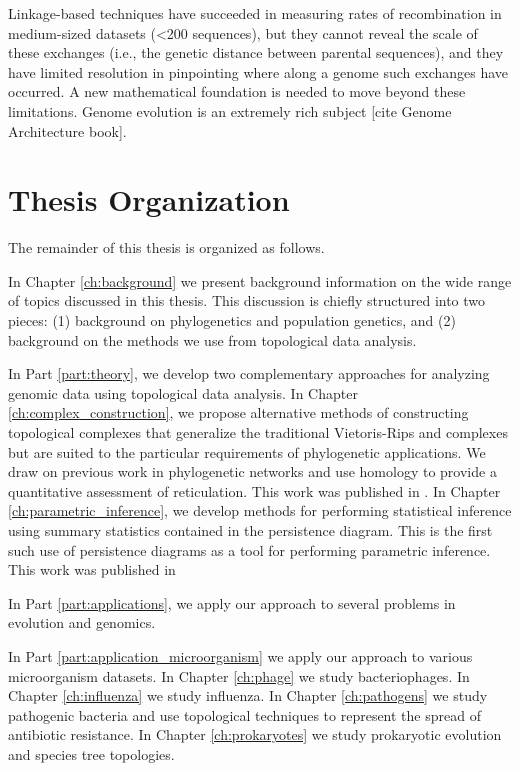 Linkage-based techniques have succeeded in measuring rates of recombination in medium-sized datasets (<200 sequences), but they cannot reveal the scale of these exchanges (i.e., the genetic distance between parental sequences), and they have limited resolution in pinpointing where along a genome such exchanges have occurred.
A new mathematical foundation is needed to move beyond these limitations.
Genome evolution is an extremely rich subject [cite Genome Architecture book].

\section{Thesis Organization}

The remainder of this thesis is organized as follows.

In Chapter \ref{ch:background} we present background information on the wide range of topics discussed in this thesis.
This discussion is chiefly structured into two pieces: (1) background on phylogenetics and population genetics, and (2) background on the methods we use from topological data analysis.

In Part \ref{part:theory}, we develop two complementary approaches for analyzing genomic data using topological data analysis.
In Chapter \ref{ch:complex_construction}, we propose alternative methods of constructing topological complexes that generalize the traditional Vietoris-Rips and \Cech complexes but are suited to the particular requirements of phylogenetic applications.
We draw on previous work in phylogenetic networks and use homology to provide a quantitative assessment of reticulation.
This work was published in \cite{Emmett:2015a}.
In Chapter \ref{ch:parametric_inference}, we develop methods for performing statistical inference using summary statistics contained in the persistence diagram.
This is the first such use of persistence diagrams as a tool for performing parametric inference. This work was published in \cite{Emmett:2014b}

In Part \ref{part:applications}, we apply our approach to several problems in evolution and genomics.


In Part \ref{part:application_microorganism} we apply our approach to various microorganism datasets.
In Chapter \ref{ch:phage} we study bacteriophages.
In Chapter \ref{ch:influenza} we study influenza.
In Chapter \ref{ch:pathogens} we study pathogenic bacteria and use topological techniques to represent the spread of antibiotic resistance.
In Chapter \ref{ch:prokaryotes} we study prokaryotic evolution and species tree topologies.

